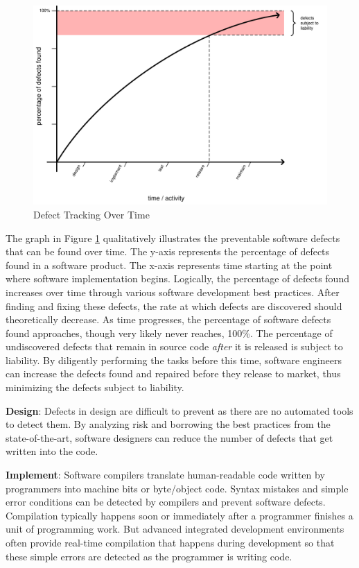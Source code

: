 \documentclass[12pt]{report}
\begin{document}
\begin{figure}[t] 
\begin{center} 
\includegraphics[scale=0.77]{figures/graph.pdf} 
\end{center} 
\caption{Defect Tracking Over Time} 
\label{fig:bugs} 
\end{figure} 

The graph in Figure \ref{fig:bugs} qualitatively illustrates the preventable software defects that can be found over time. The y-axis represents the percentage of defects found in a software product. The x-axis represents time starting at the point where software implementation begins. Logically, the percentage of defects found increases over time through various software development best practices. After finding and fixing these defects, the rate at which defects are discovered should theoretically decrease. As time progresses, the percentage of software defects found approaches, though very likely never reaches, 100\%. The percentage of undiscovered defects that remain in source code \textit{after} it is released is subject to liability. By diligently performing the tasks before this time, software engineers can increase the defects found and repaired before they release to market, thus minimizing the defects subject to liability. 

\textbf{Design}: Defects in design are difficult to prevent as there are no automated tools to detect them. By analyzing risk and borrowing the best practices from the state-of-the-art, software designers can reduce the number of defects that get written into the code. 

\textbf{Implement}: Software compilers translate human-readable code written by programmers into machine bits or byte/object code. Syntax mistakes and simple error conditions can be detected by compilers and prevent software defects. Compilation typically happens soon or immediately after a programmer finishes a unit of programming work. But advanced integrated development environments often provide real-time compilation that happens during development so that these simple errors are detected as the programmer is writing code. 
\end{document}
